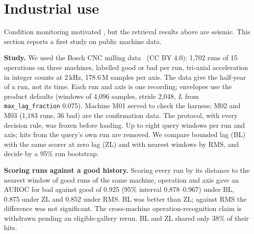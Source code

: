 
\section{Industrial use}\label{sec:industrial}
Condition monitoring motivated \M{}, but the retrieval results above are seismic. This section reports a first
study on public machine data.

\textbf{Study.} We used the Bosch CNC milling data~\cite{bosch-cnc} (CC BY 4.0): 1,702 runs of 15 operations on three
machines, labelled good or bad per run, tri-axial acceleration in integer counts at 2\,kHz, 178.6\,M samples per axis.
The data give the half-year of a run, not its time. Each run and axis is one recording; envelopes use the product
defaults (windows of 4,096 samples, stride 2,048, $L$ from \texttt{max\_lag\_fraction} 0.075). Machine M01 served to
check the harness; M02 and M03 (1,183 runs, 36 bad) are the confirmation data. The protocol, with every decision rule,
was frozen before loading. Up to eight query windows per run and axis; hits from the query's own run are removed. We
compare bounded lag (BL) with the same scorer at zero lag (ZL) and with nearest windows by RMS, and decide by a 95\%
run bootstrap.

\textbf{Scoring runs against a good history.} Scoring every run by its distance to the nearest window of good runs of
the same machine, operation and axis gave an AUROC for bad against good of 0.925 (95\% interval 0.878--0.967) under BL,
0.875 under ZL and 0.852 under RMS. BL was better than ZL; against RMS the difference was not significant. The cross-machine operation-recognition claim is withdrawn pending an eligible-gallery rerun. BL
and ZL shared only 38\% of their hits.

